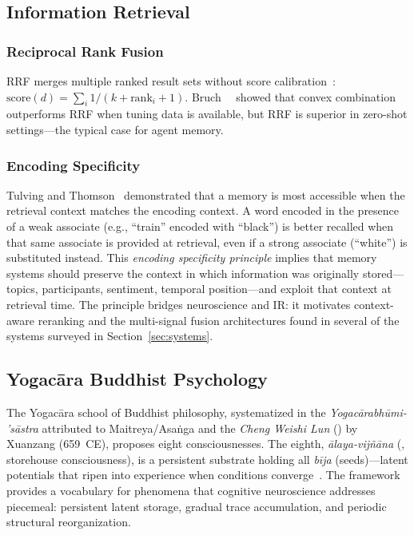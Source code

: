 \subsection{Information Retrieval}

\subsubsection{Reciprocal Rank Fusion}
RRF merges multiple ranked result sets without score
calibration~\cite{cormack2009rrf}: $\text{score}(d) = \sum_i 1 / (k +
\text{rank}_i + 1)$. Bruch~\etal~\cite{bruch2023} showed that convex
combination outperforms RRF when tuning data is available, but RRF is
superior in zero-shot settings---the typical case for agent memory.

\subsubsection{Encoding Specificity}
Tulving and Thomson~\cite{tulving1973} demonstrated that a memory is
most accessible when the retrieval context matches the encoding
context. A word encoded in the presence of a weak associate (e.g.,
``train'' encoded with ``black'') is better recalled when that same
associate is provided at retrieval, even if a strong associate
(``white'') is substituted instead. This \emph{encoding specificity
principle} implies that memory systems should preserve the context in
which information was originally stored---topics, participants,
sentiment, temporal position---and exploit that context at retrieval
time. The principle bridges neuroscience and IR: it motivates context-aware
reranking and the multi-signal fusion architectures found in several of
the systems surveyed in Section~\ref{sec:systems}.

\subsection{Yogac\=ara Buddhist Psychology}

The Yogac\=ara school of Buddhist philosophy, systematized in the
\emph{Yogac\=arabh\=umi-\\'s\=astra} attributed to
Maitreya/Asa\.{n}ga and the \emph{Cheng Weishi Lun} ()
by Xuanzang (659~CE), proposes eight consciousnesses. The eighth,
\emph{\=alaya-vij\~n\=ana} (, storehouse consciousness),
is a persistent substrate holding all \emph{b\=ija} (seeds)---latent
potentials that ripen into experience when conditions
converge~\cite{yogacarabhumi, chengweishilun}. The framework provides a
vocabulary for phenomena that cognitive neuroscience addresses piecemeal:
persistent latent storage, gradual trace accumulation, and periodic
structural reorganization.

